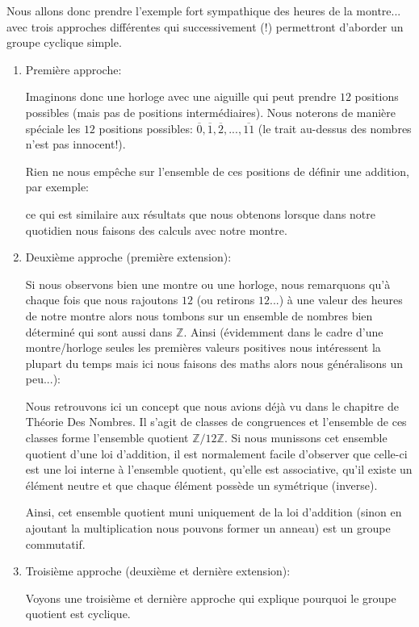 	Nous allons donc prendre l'exemple fort sympathique des heures de la montre... avec trois approches différentes qui successivement (!) permettront d'aborder un groupe cyclique simple.
	\begin{enumerate}
		\item Première approche:
		
		Imaginons donc une horloge avec une aiguille qui peut prendre $12$ positions possibles (mais pas de positions intermédiaires). Nous noterons de manière spéciale les $12$ positions possibles: $\overline{0},\overline{1},\overline{2},...,\overline{11}$ (le trait au-dessus des nombres n'est pas innocent!).
		
		Rien ne nous empêche sur l'ensemble de ces positions de définir une addition, par exemple:
		
	  	ce qui est similaire aux résultats que nous obtenons lorsque dans notre quotidien nous faisons des calculs avec notre montre.
	  	
	  	\item Deuxième approche (première extension):
	  	
	  	Si nous observons bien une montre ou une horloge, nous remarquons qu'à chaque fois que nous rajoutons $12$ (ou retirons $12$...) à une valeur des heures de notre montre alors nous tombons sur un ensemble de nombres bien déterminé qui sont aussi dans $\mathbb{Z}$. Ainsi (évidemment dans le cadre d'une montre/horloge seules les premières valeurs positives nous intéressent la plupart du temps mais ici nous faisons des maths alors nous généralisons un peu...):
	  	
		Nous retrouvons ici un concept que nous avions déjà vu dans le chapitre de Théorie Des Nombres. Il s'agit de classes de congruences et l'ensemble de ces classes forme l'ensemble quotient $\mathbb{Z}/12\mathbb{Z}$. Si nous munissons cet ensemble quotient d'une loi d'addition, il est normalement facile d'observer que celle-ci est une loi interne à l'ensemble quotient, qu'elle est associative, qu'il existe un élément neutre et que chaque élément possède un symétrique (inverse).
		
		Ainsi, cet ensemble quotient muni uniquement de la loi d'addition (sinon en ajoutant la multiplication nous pouvons former un anneau) est un groupe commutatif.

		\item Troisième approche (deuxième et dernière extension):
		
		Voyons une troisième et dernière approche qui explique pourquoi le groupe quotient est cyclique. 
		

\end{enumerate}
